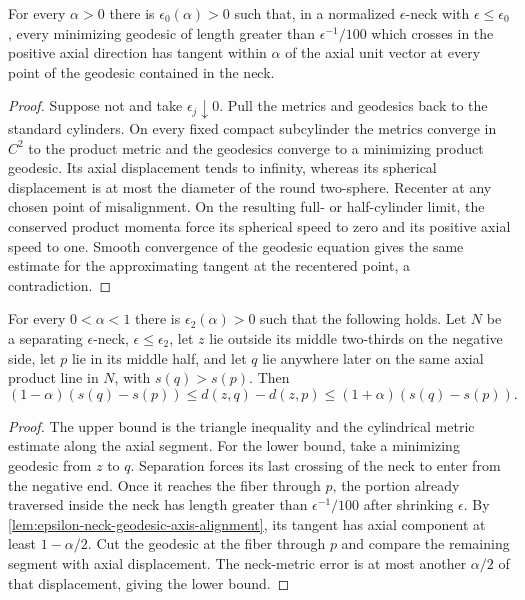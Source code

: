 \begin{lemma}
\label{lem:epsilon-neck-geodesic-axis-alignment}
\notready
For every $\alpha>0$ there is $\epsilon_0(\alpha)>0$ such that, in a
normalized $\epsilon$-neck with $\epsilon\le\epsilon_0$, every minimizing
geodesic of length greater than $\epsilon^{-1}/100$ which crosses in the
positive axial direction has tangent within $\alpha$ of the axial unit
vector at every point of the geodesic contained in the neck.
\end{lemma}

\begin{proof}
Suppose not and take $\epsilon_j\downarrow0$.  Pull the metrics and geodesics
back to the standard cylinders.  On every fixed compact subcylinder the
metrics converge in $C^2$ to the product metric and the geodesics converge
to a minimizing product geodesic.  Its axial displacement tends to infinity,
whereas its spherical displacement is at most the diameter of the round
two-sphere.  Recenter at any chosen point of misalignment.  On the resulting
full- or half-cylinder limit, the conserved product momenta force its
spherical speed to zero and its positive axial speed to one.  Smooth
convergence of the geodesic equation gives the same estimate for the
approximating tangent at the recentered point, a contradiction.
\end{proof}

\begin{lemma}
\label{lem:external-point-neck-distance-comparison}
\notready
For every $0<\alpha<1$ there is $\epsilon_2(\alpha)>0$ such that the
following holds.  Let $N$ be a separating $\epsilon$-neck,
$\epsilon\le\epsilon_2$, let $z$ lie outside its middle two-thirds on the
negative side, let $p$ lie in its middle half, and let $q$ lie anywhere later
on the same axial product line in $N$, with $s(q)>s(p)$.  Then
\[
 (1-\alpha)(s(q)-s(p))
 \le d(z,q)-d(z,p)
 \le(1+\alpha)(s(q)-s(p)).
\]
\end{lemma}

\begin{proof}
The upper bound is the triangle inequality and the cylindrical metric
estimate along the axial segment.  For the lower bound, take a minimizing
geodesic from $z$ to $q$.  Separation forces its last crossing of the neck
to enter from the negative end.  Once it reaches the fiber through $p$, the
portion already traversed inside the neck has length greater than
$\epsilon^{-1}/100$ after shrinking $\epsilon$.
By \ref{lem:epsilon-neck-geodesic-axis-alignment}, its tangent has axial
component at least $1-\alpha/2$.  Cut the geodesic at the fiber through $p$
and compare the remaining segment with axial displacement.  The neck-metric
error is at most another $\alpha/2$ of that displacement, giving the lower
bound.
\end{proof}

